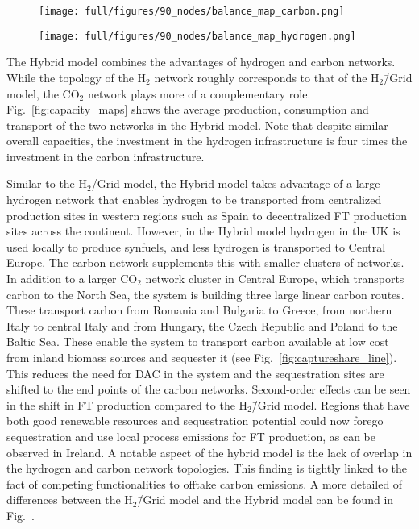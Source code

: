\documentclass[twocolumn]{article}
\newcommand{\COtwo}{CO$_2$}
\newcommand{\Htwo}{H$_2$}
\newcommand{\modH}{H$_2$\=/Grid model}
\newcommand{\modHybrid}{Hybrid model}
\begin{document}
\begin{figure*}[ht!]
    \centering
    \begin{subfigure}{.51\textwidth}
        \centering
        \texttt{[image: full/figures/90\_nodes/balance\_map\_carbon.png]}
        \label{fig:capacity_map_carbon_co2}
    \end{subfigure}%
    \begin{subfigure}{.49\textwidth}
        \centering
        \texttt{[image: full/figures/90\_nodes/balance\_map\_hydrogen.png]}
        \label{fig:capacity_map_hydrogen_co2}
    \end{subfigure}
    \caption{Optimal production and transport capacities of the carbon and hydrogen sector in a net-zero energy system in Europe with both \COtwo{} and \Htwo{} network expansion (Hybrid).
    }
    \label{fig:capacity_maps}
\end{figure*}

The \modHybrid{} combines the advantages of hydrogen and carbon networks. While the topology of the \Htwo{} network roughly corresponds to that of the \modH{}, the \COtwo{} network plays more of a complementary role. Fig.~\ref{fig:capacity_maps} shows the average production, consumption and transport of the two networks in the \modHybrid{}. Note that despite similar overall capacities, the investment in the hydrogen infrastructure is four times the investment in the carbon infrastructure.


Similar to the \modH{}, the \modHybrid{} takes advantage of a large hydrogen network that enables hydrogen to be transported from centralized production sites in western regions such as Spain to decentralized FT production sites across the continent. However, in the \modHybrid{} hydrogen in the UK is used locally to produce synfuels, and less hydrogen is transported to Central Europe.
The carbon network supplements this with smaller clusters of networks. In addition to a larger \COtwo{} network cluster in Central Europe, which transports carbon to the North Sea, the system is building three large linear carbon routes. These transport carbon from Romania and Bulgaria to Greece, from northern Italy to central Italy and from Hungary, the Czech Republic and Poland to the Baltic Sea. These enable the system to transport carbon available at low cost from inland biomass sources and sequester it (see Fig.~\ref{fig:captureshare_line}). This reduces the need for DAC in the system and the sequestration sites are shifted to the end points of the carbon networks. Second-order effects can be seen in the shift in FT production compared to the \modH{}. Regions that have both good renewable resources and sequestration potential could now forego sequestration and use local process emissions for FT production, as can be observed in Ireland. A notable aspect of the hybrid model is the lack of overlap in the hydrogen and carbon network topologies. This finding is tightly linked to the fact of competing functionalities to offtake carbon emissions.
A more detailed of differences between the \modH{} and the \modHybrid{} can be found in Fig.~.
\end{document}
